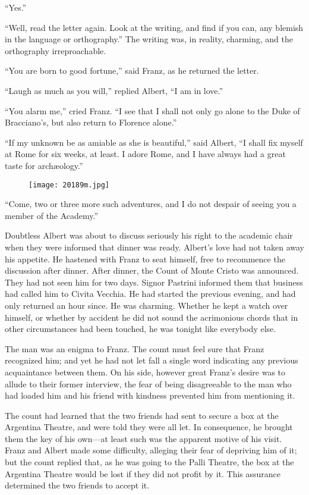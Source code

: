 “Yes.”

“Well, read the letter again. Look at the writing, and find if you can,
any blemish in the language or orthography.” The writing was, in
reality, charming, and the orthography irreproachable.

“You are born to good fortune,” said Franz, as he returned the letter.

“Laugh as much as you will,” replied Albert, “I am in love.”

“You alarm me,” cried Franz. “I see that I shall not only go alone to
the Duke of Bracciano’s, but also return to Florence alone.”

“If my unknown be as amiable as she is beautiful,” said Albert, “I
shall fix myself at Rome for six weeks, at least. I adore Rome, and I
have always had a great taste for archæology.”

\begin{figure}[ht]
\texttt{[image: 20189m.jpg]}
\end{figure}

“Come, two or three more such adventures, and I do not despair of
seeing you a member of the Academy.”

Doubtless Albert was about to discuss seriously his right to the
academic chair when they were informed that dinner was ready. Albert’s
love had not taken away his appetite. He hastened with Franz to seat
himself, free to recommence the discussion after dinner. After dinner,
the Count of Monte Cristo was announced. They had not seen him for two
days. Signor Pastrini informed them that business had called him to
Civita Vecchia. He had started the previous evening, and had only
returned an hour since. He was charming. Whether he kept a watch over
himself, or whether by accident he did not sound the acrimonious chords
that in other circumstances had been touched, he was tonight like
everybody else.

The man was an enigma to Franz. The count must feel sure that Franz
recognized him; and yet he had not let fall a single word indicating
any previous acquaintance between them. On his side, however great
Franz’s desire was to allude to their former interview, the fear of
being disagreeable to the man who had loaded him and his friend with
kindness prevented him from mentioning it.

The count had learned that the two friends had sent to secure a box at
the Argentina Theatre, and were told they were all let. In consequence,
he brought them the key of his own—at least such was the apparent
motive of his visit. Franz and Albert made some difficulty, alleging
their fear of depriving him of it; but the count replied that, as he
was going to the Palli Theatre, the box at the Argentina Theatre would
be lost if they did not profit by it. This assurance determined the two
friends to accept it.

